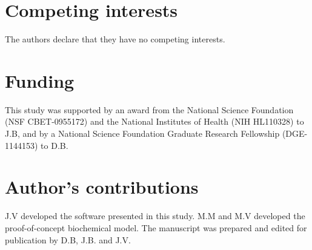 \documentclass{bmcart}
\begin{document}
\begin{backmatter}

\section*{Competing interests}
  The authors declare that they have no competing interests.

\section*{Funding}
This study was supported by an award from the National Science Foundation (NSF CBET-0955172) and the National Institutes of Health (NIH HL110328) to J.B, and by
a National Science Foundation Graduate Research Fellowship (DGE-1144153) to D.B.

\section*{Author's contributions}
    J.V developed the software presented in this study. M.M and M.V developed the proof-of-concept biochemical model.
    The manuscript was prepared and edited for publication by D.B, J.B. and J.V.




\end{backmatter}
\end{document}
